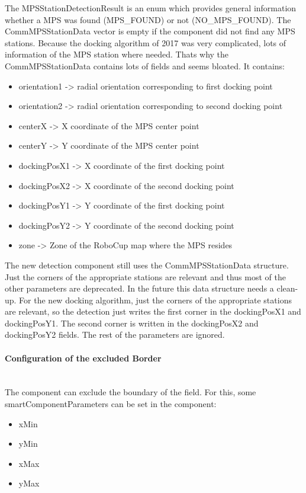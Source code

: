 The MPSStationDetectionResult is an enum which provides general information whether a MPS was found (MPS\_FOUND) or not (NO\_MPS\_FOUND).
The CommMPSStationData vector is empty if the component did not find any MPS stations. Because the docking algorithm of 2017 was very complicated, lots of information of the MPS station where needed. Thats why the CommMPSStationData contains lots of fields and seems bloated. It contains:

\begin{itemize}
\item orientation1 -> radial orientation corresponding to first docking point
\item orientation2 -> radial orientation corresponding to second docking point
\item centerX -> X coordinate of the MPS center point
\item centerY -> Y coordinate of the MPS center point
\item dockingPosX1 -> X coordinate of the first docking point
\item dockingPosX2 -> X coordinate of the second docking point
\item dockingPosY1 -> Y coordinate of the first docking point
\item dockingPosY2 -> Y coordinate of the second docking point
\item zone -> Zone of the RoboCup map where the MPS resides
\end{itemize}

The new detection component still uses the CommMPSStationData structure. Just the corners of the appropriate stations are relevant and thus most of the other parameters are deprecated. In the future this data structure needs a clean-up. For the new docking algorithm, just the corners of the appropriate stations are relevant, so the detection just writes the first corner in the dockingPosX1 and dockingPosY1. The second corner is written in the dockingPosX2 and dockingPosY2 fields. The rest of the parameters are ignored.

\paragraph{Configuration of the excluded Border} $\;$ \\
The component can exclude the boundary of the field. For this, some smartComponentParameters can be set in the component:
 
\begin{itemize}
\item xMin
\item yMin
\item xMax
\item yMax
\end{itemize}

